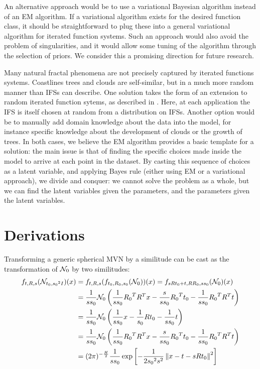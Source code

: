\documentclass[10pt,a4paper,oneside]{article}
\theoremstyle{definition}
\newcommand{\cN}{{\cal N}}
\theoremstyle{definition}
\begin{document}
An alternative approach would be to use a variational Bayesian algorithm instead of an EM algorithm. If a variational algorithm exists for the desired function class, it should be straightforward to plug these into a general variational algorithm for iterated function systems. Such an approach would also avoid the problem of singularities, and it would allow some tuning of the algorithm through the selection of priors. We consider this a promising direction for future research.

Many natural fractal phenomena are not precisely captured by iterated functions systems. Coastlines trees and clouds are self-similar, but in a much more random manner than IFSs can describe. One solution takes the form of an extension to random iterated function sytems, as described in \cite{hart1996fractal}. Here, at each application the IFS is itself chosen at random from a distribution on IFSs. Another option would be to manually add domain knowledge about the data into the model, for instance specific knowledge about the development of clouds or the growth of trees. In both cases, we believe the EM algorithm provides a basic template for a solution: the main issue is that of finding the specific choices made inside the model to arrive at each point in the dataset. By casting this sequence of choices as a latent variable, and applying Bayes rule (either using EM or a variational approach), we divide and conquer: we cannot solve the problem as a whole, but we can find the latent variables given the parameters, and the parameters given the latent variables.




\appendix

\section{Derivations}

Transforming a generic spherical MVN by a similitude can be cast as the transformation of $\cN_0$ by two similitudes:
\begin{align*}
f_{t, R, s}(\cN_{t_0, {s_0}^2 I})(x) &= f_{t, R, s}(f_{t_0, R_0, s_0}(\cN_0))(x) = f_{ sRt_0+t, RR_0,ss_0}(\cN_0)(x) \\
&= \frac{1}{ss_0} \cN_0\left(\frac{1}{ss_0} {R_0}^T R^T x - \frac{s}{ss_0} {R_0}^Tt_0 - \frac{1}{ss_0} {R_0}^TR^Tt \right) \\
&= \frac{1}{ss_0} \cN_0\left(\frac{1}{ss_0} x - \frac{1}{s_0} {R}t_0 - \frac{1}{ss_0} t \right) \\
&= \frac{1}{ss_0} \cN_0\left(\frac{1}{ss_0} {R_0}^T R^T x - \frac{s}{ss_0} {R_0}^Tt_0 - \frac{1}{ss_0} {R_0}^TR^Tt \right) \\
&=  (2\pi)^{-\frac{H}{2}} \frac{1}{ss_0} \exp \left[- \frac{1}{2{s_0}^2s^2}\left\| x- t - s R t_0 \right \|^2\right]
\end{align*}
\end{document}
